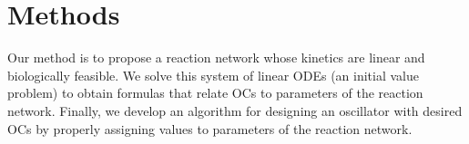 \documentclass{bmcart}
\begin{document}



\section*{Methods}
Our method is to propose a reaction network whose kinetics are linear and biologically feasible. We solve this system of linear ODEs (an initial value problem) to obtain formulas that relate OCs to parameters of the reaction network. Finally, we develop an algorithm for designing an oscillator with desired OCs by properly assigning values to parameters of the reaction network.
\end{document}
